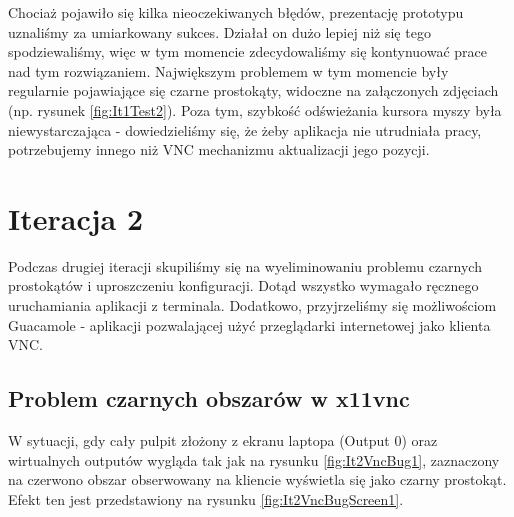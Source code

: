 
    Chociaż pojawiło się kilka nieoczekiwanych błędów, prezentację prototypu uznaliśmy za umiarkowany sukces. Działał on dużo lepiej niż się tego spodziewaliśmy, więc w tym momencie zdecydowaliśmy się kontynuować prace nad tym rozwiązaniem. Największym problemem w tym momencie były regularnie pojawiające się czarne prostokąty, widoczne na załączonych zdjęciach (np. rysunek \ref{fig:It1Test2}). Poza tym, szybkość odświeżania kursora myszy była niewystarczająca - dowiedzieliśmy się, że żeby aplikacja nie utrudniała pracy, potrzebujemy innego niż VNC mechanizmu aktualizacji jego pozycji.

    \vfill
    \pagebreak

\section{Iteracja 2}

  Podczas drugiej iteracji skupiliśmy się na wyeliminowaniu problemu czarnych prostokątów i uproszczeniu konfiguracji. Dotąd wszystko wymagało ręcznego uruchamiania aplikacji z terminala. Dodatkowo, przyjrzeliśmy się możliwościom Guacamole - aplikacji pozwalającej użyć przeglądarki internetowej jako klienta VNC.

  \subsection{Problem czarnych obszarów w x11vnc}

    W sytuacji, gdy cały pulpit złożony z ekranu laptopa (Output 0) oraz wirtualnych outputów wygląda tak jak na rysunku \ref{fig:It2VncBug1}, zaznaczony na czerwono obszar obserwowany na kliencie wyświetla się jako czarny prostokąt. Efekt ten jest przedstawiony na rysunku \ref{fig:It2VncBugScreen1}. \\


